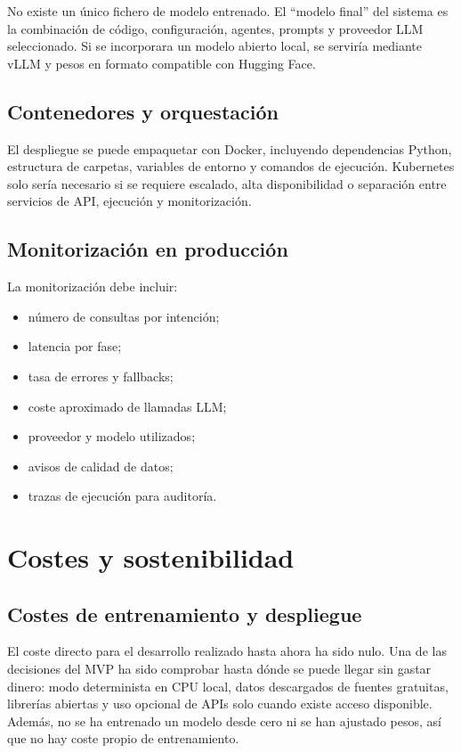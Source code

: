\documentclass[11pt,a4paper]{article}
\let\oldsection\section
\renewcommand{\section}{\clearpage\oldsection}
\begin{document}
No existe un \'unico fichero de modelo entrenado. El ``modelo final'' del sistema es la combinaci\'on de c\'odigo, configuraci\'on, agentes, prompts y proveedor LLM seleccionado. Si se incorporara un modelo abierto local, se servir\'ia mediante vLLM y pesos en formato compatible con Hugging Face.

\subsection{Contenedores y orquestaci\'on}

El despliegue se puede empaquetar con Docker, incluyendo dependencias Python, estructura de carpetas, variables de entorno y comandos de ejecuci\'on. Kubernetes solo ser\'ia necesario si se requiere escalado, alta disponibilidad o separaci\'on entre servicios de API, ejecuci\'on y monitorizaci\'on.

\subsection{Monitorizaci\'on en producci\'on}

La monitorizaci\'on debe incluir:

\begin{itemize}
    \item n\'umero de consultas por intenci\'on;
    \item latencia por fase;
    \item tasa de errores y fallbacks;
    \item coste aproximado de llamadas LLM;
    \item proveedor y modelo utilizados;
    \item avisos de calidad de datos;
    \item trazas de ejecuci\'on para auditor\'ia.
\end{itemize}

\section{Costes y sostenibilidad}

\subsection{Costes de entrenamiento y despliegue}

El coste directo para el desarrollo realizado hasta ahora ha sido nulo. Una de las decisiones del MVP ha sido comprobar hasta d\'onde se puede llegar sin gastar dinero: modo determinista en CPU local, datos descargados de fuentes gratuitas, librer\'ias abiertas y uso opcional de APIs solo cuando existe acceso disponible. Adem\'as, no se ha entrenado un modelo desde cero ni se han ajustado pesos, as\'i que no hay coste propio de entrenamiento.
\end{document}

